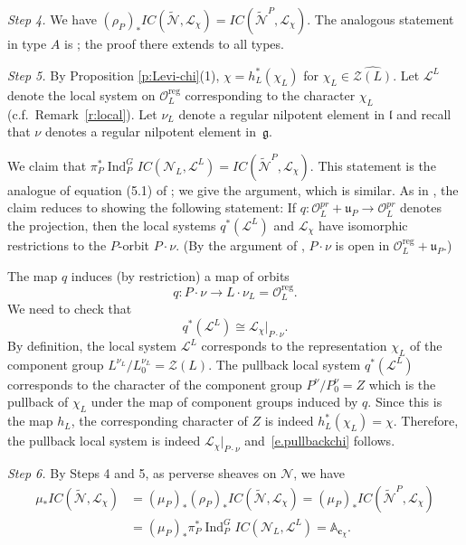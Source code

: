 \documentclass[reqno,11pt]{amsart}
\theoremstyle{remark}
\theoremstyle{remark}
\theoremstyle{definition}
\theoremstyle{definition}
\theoremstyle{definition}
\numberwithin{equation}{section}
\newcommand{\A}{\mathbb{ A}}
\newcommand{\Ind}{\operatorname{Ind}}
\newcommand{\fg}{{\mathfrak g}}
\newcommand{\fl}{{\mathfrak l}}
\newcommand{\fu}{{\mathfrak u}}
\newcommand{\cl}{\mathcal{L}}
\newcommand{\cn}{\mathcal{N}}
\newcommand{\co}{\mathcal{O}}
\newcommand{\cz}{\mathcal{Z}}
\newcommand{\vc}{\mathbf{c}}
\newcommand{\nilp}{\nu}
\renewcommand{\tilde}{\widetilde}
\newcommand{\reg}{\mathrm{reg}}
\begin{document}
\medskip

{\em Step 4.} 
We have $(\rho_P)_* IC(\tilde{\cn}, \cl_{\chi}) = IC(\tilde{\cn}^P, \cl_{\chi})$.  The analogous statement in type $A$ is \cite[Theorem~4.6]{GPR23}; the proof there extends to all types.

\medskip

{\em Step 5.}  
By Proposition \ref{p:Levi-chi}(1), $\chi = h_L^*(\chi_L)$ for $\chi_L \in \widehat{\cz(L)}$. Let $\cl^L$ denote the local system on $\co^{\reg}_L$ corresponding to the character $\chi_L$ (c.f.~Remark~\ref{r:local}). Let $\nilp_L$ denote a regular nilpotent element in $\fl$ and  recall that $\nilp$ denotes a regular nilpotent element in~$\fg$. 


We claim that $\pi_P^* \Ind_P^G IC(\cn_L, \cl^L) = IC(\tilde{\cn}^P, \cl_{\chi})$.  
This statement is the analogue of equation (5.1) of \cite{GPR23}; we give the argument, which is similar.  
As in \cite{GPR23}, the claim reduces to showing the following statement: If $q: \co_L^{pr} + \fu_P \to \co_L^{pr}$ denotes the projection, then the local systems $q^* (\cl^L)$  and $\cl_{\chi}$ have isomorphic restrictions to the $P$-orbit $P \cdot \nilp$.  (By the argument of \cite[Remark 5.2]{GPR23}, $P \cdot \nilp$ is open in $\co^{\reg}_L + \fu_P$.)

The map $q$ induces (by restriction) a map of orbits
\begin{equation} \label{e.orbitmap}
q: P \cdot \nilp \to L \cdot \nilp_L = \co^{\reg}_L.
\end{equation}
We need to check that 
\begin{equation} \label{e.pullbackchi}
q^* (\cl^L) \cong \cl_{\chi}|_{P \cdot \nilp}.
\end{equation}    
By definition, the local system $\cl^L$ corresponds to the representation $\chi_L$ of the component group  $L^{\nilp_L}/L^{\nilp_L}_0 = \cz(L)$.  
The pullback local system $q^* (\cl^L) $ corresponds to the character of the component group $P^{\nilp}/P^{\nilp}_0 = Z$
which is the pullback of $\chi_L$ under the map of component groups induced by $q$.  Since this is the map $h_L$, the corresponding character of $Z$ is indeed $h_L^*(\chi_L) = \chi$.  Therefore, the pullback local system is indeed $\cl_{\chi}|_{P \cdot \nilp}$ and~\eqref{e.pullbackchi} follows.

\medskip

{\em Step 6.}
By Steps 4 and 5, as perverse sheaves on $\cn$, we have
\begin{align*}
\mu_*  IC(\tilde{\cn}, \cl_{\chi}) & = (\mu_P)_*(\rho_P)_* IC(\tilde{\cn}, \cl_{\chi}) = (\mu_P)_* IC(\tilde{\cn}^P, \cl_{\chi}) \\
& = (\mu_P)_* \pi_P^* \Ind_P^G IC(\cn_L, \cl^L) = \A_{\vc_{\chi}}.
\end{align*}
\end{document}

